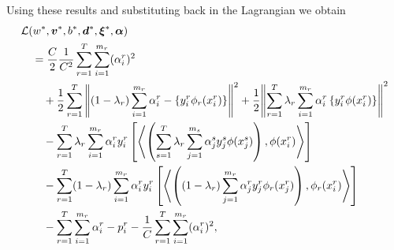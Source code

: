 Using these results and substituting back in the Lagrangian we obtain
\begin{equation}\nonumber
    \begin{aligned}
         &\mathcal{L}({{w}}^*, {\bm{v}}^*, {b}^*, {\bm{d}}^*, {\bm{\xi}}^*, \bm{\alpha}) \\
        &\quad= \frac{C}{2} \frac{1}{C^2} \sum_{r=1}^T \sum_{i=1}^{m_r} (\alpha_i^r)^2  \\
        &\qquad +  \frac{1}{2} \sum_{r= 1}^T{\left\lVert (1 - \lambda_r) \sum_{i=1}^{m_r}  {\alpha_i^r} - \left\lbrace y_i^r \phi_r({x}_i^r) \right\rbrace\right\rVert^2} + \frac{1}{2} {\left\lVert\sum_{r= 1}^T \lambda_r \sum_{i=1}^{m_r} {\alpha_i^r} \left\lbrace y_i^r \phi({x}_i^r) \right\rbrace\right\rVert}^2 \\
        &\qquad - \sum_{r= 1}^T \lambda_r \sum_{i=1}^{m_r} \alpha_i^r  y_{i}^r \left[ \bm{\left\langle} \left(\sum_{s= 1}^T \lambda_r \sum_{j=1}^{m_s} {\alpha_j^s}  y_j^s \phi({x}_j^s)  \right), \phi({x}_{i}^r) \bm{\right\rangle} \right]   \\
        &\qquad -  \sum_{r= 1}^T (1-\lambda_r) \sum_{i=1}^{m_r} \alpha_i^r  y_{i}^r \left[ \bm{\left\langle} \left((1-\lambda_r) \sum_{j=1}^{m_r} {\alpha_j^r}  y_j^r \phi_r({x}_j^r) \right), \phi_r({x}_{i}^r) \bm{\right\rangle}  \right]  \\
        &\qquad -  \sum_{r= 1}^T \sum_{i=1}^{m_r} \alpha_i^r  - p_{i}^r  - \frac{1}{C} \sum_{r=1}^T \sum_{i=1}^{m_r} (\alpha_i^r)^2  ,\\
    \end{aligned}
\end{equation}
